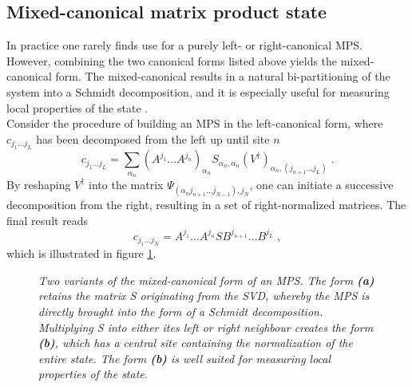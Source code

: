 \subsection{Mixed-canonical matrix product state}
In practice one rarely finds use for a purely left- or right-canonical MPS. However, combining the two canonical forms listed above yields the mixed-canonical form. The mixed-canonical results in a natural bi-partitioning of the system into a Schmidt decomposition, and it is especially useful for measuring local properties of the state \cite{schollwock}.\\
Consider the procedure of building an MPS in the left-canonical form, where $c_{j_1 \ldots j_L}$ has been decomposed from the left up until site $n$
\begin{equation}
	c_{j_1 \ldots j_L} = \sum_{\alpha_n} \left( A^{j_1} \ldots  A^{j_n} \right) _{\alpha_n} S_{\alpha_n , \alpha_n} (V^{\dag})_{\alpha_n , (j_{n+1} \ldots j_L)} \; .
\end{equation}
By reshaping $V^{\dag}$  into the matrix $\Psi_{(\alpha_n j_{n+1} \ldots j_{N-1}),j_N}$, one can initiate a successive decomposition from the right, resulting in a set of right-normalized matrices. The final result reads
\begin{equation}
	c_{j_1 \ldots j_N} = A^{j_1} \ldots A^{j_n} S B^{j_{n+1}} \ldots B^{j_L} \; ,
	\label{eq:mixedCanon}
\end{equation}
which is illustrated in figure \ref{fig:MixedCanonical1}.
\begin{figure}[h!]
\centering %
\begin{subfigure}[b]{0.47\textwidth}
	\caption{}  	
  	
	\label{fig:MixedCanonical1}
\end{subfigure}
\hspace{5mm}
\begin{subfigure}[b]{0.47\textwidth}    
	\caption{}  	
  	
	\label{fig:MixedCanonical2}
\end{subfigure}
\caption{\textit{Two variants of the mixed-canonical form of an MPS. The form \textbf{(a)} retains the matrix S originating from the SVD, whereby the MPS is directly brought into the form of a Schmidt decomposition. Multiplying S into either ites left or right neighbour creates the form \textbf{(b)}, which has a central site containing the normalization of the entire state. The form \textbf{(b)} is well suited for measuring local properties of the state.}}
\end{figure}
